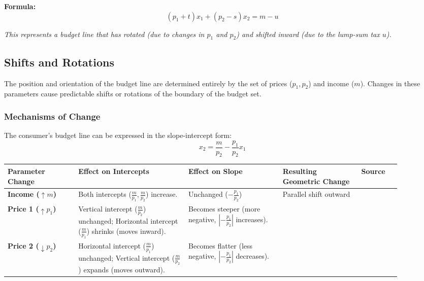\documentclass{article}
\begin{document}
\textbf{Formula:} $$(p_1 + t)x_1 + (p_2 - s)x_2 = m - u$$

\textit{This represents a budget line that has rotated (due to changes in $p_1$ and $p_2$) and shifted inward (due to the lump-sum tax $u$).}

\subsection{Shifts and Rotations}

The position and orientation of the budget line are determined entirely by the set of prices ($p_1, p_2$) and income ($m$). Changes in these parameters cause predictable shifts or rotations of the boundary of the budget set.

\subsubsection*{Mechanisms of Change}

The consumer's budget line can be expressed in the slope-intercept form: \[ x_2 = \frac{m}{p_2} - \frac{p_1}{p_2} x_1 \]

\begin{center}
\begin{tabular}{>{\raggedright\arraybackslash}p{0.18\linewidth} >{\raggedright\arraybackslash}p{0.28\linewidth} >{\raggedright\arraybackslash}p{0.24\linewidth} >{\raggedright\arraybackslash}p{0.20\linewidth} p{0cm}}
\toprule
\textbf{Parameter Change}& \textbf{Effect on Intercepts}& \textbf{Effect on Slope}& \textbf{Resulting Geometric Change}& \textbf{Source} \\
\midrule
\textbf{Income ($\uparrow m$)}&  Both intercepts ($\frac{m}{p_1}, \frac{m}{p_2}$) increase.& Unchanged ($-\frac{p_1}{p_2}$)& Parallel shift outward&   \\ \addlinespace
\textbf{Price 1 ($\uparrow p_1$)}&  Vertical intercept ($\frac{m}{p_2}$) unchanged; Horizontal intercept ($\frac{m}{p_1}$) shrinks (moves inward).& Becomes steeper (more negative, $| -\frac{p_1}{p_2}| $ increases). & & \\ \addlinespace
\textbf{Price 2 ($\downarrow p_2$)}&  Horizontal intercept ($\frac{m}{p_1}$) unchanged; Vertical intercept ($\frac{m}{p_2}$) expands (moves outward).& Becomes flatter (less negative, $| -\frac{p_1}{p_2}| $ decreases). & & \\
\bottomrule

\end{tabular}

\end{center}
\end{document}
